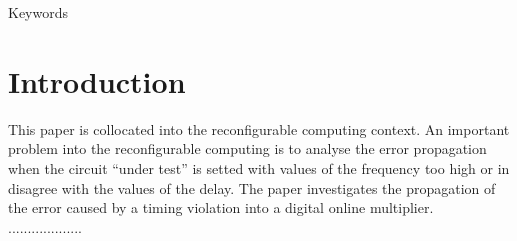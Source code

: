 \documentclass[journal]{IEEEtran}
\begin{document}
\begin{IEEEkeywords}
Keywords
\end{IEEEkeywords}






%
\IEEEpeerreviewmaketitle



\section{Introduction}
This paper is collocated into the reconfigurable computing context. An important problem into the reconfigurable computing is to analyse the error propagation when the circuit ``under test'' is setted with values of the frequency too high or in disagree with the values of the delay. The paper investigates the propagation of the error caused by a timing violation into a digital online multiplier. \\

...................\\
\end{document}
